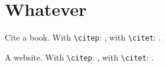 \documentclass{report}
\begin{document}
\chapter{Whatever}
Cite a book. With \verb+\citep+: \citep{TIJ}, with \verb+\citet+: \citet{TIJ}.

A website. With \verb=\citep=: \citep{website:reflection},
with \verb=\citet=: \citet{website:reflection}.

\appendix

\nocite{*}	%


\end{document}
